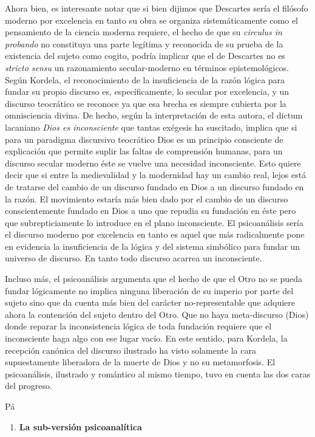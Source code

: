 Ahora bien, es interesante notar que si bien dijimos que Descartes sería el filósofo moderno por excelencia en tanto su obra se organiza sistemáticamente como el pensamiento de la ciencia moderna requiere, el hecho de que su \emph{circulus in probando} no constituya una parte legítima y reconocida de su prueba de la existencia del sujeto como cogito, podría implicar que el de Descartes no es \emph{stricto sensu} un razonamiento secular-moderno en términos epistemológicos. Según Kordela, el reconocimiento de la insuficiencia de la razón lógica para fundar su propio discurso es, específicamente, lo secular por excelencia, y un discurso teocrático se reconoce ya que esa brecha es siempre cubierta por la omnisciencia divina. De hecho, según la interpretación de esta autora, el dictum lacaniano \emph{Dios es inconsciente} que tantas exégesis ha suscitado, implica que si para un paradigma discursivo teocrático Dios es un principio consciente de explicación que permite suplir las faltas de comprensión humanas, para un discurso secular moderno éste se vuelve una necesidad inconsciente. Esto quiere decir que si entre la medievalidad y la modernidad hay un cambio real, lejos está de tratarse del cambio de un discurso fundado en Dios a un discurso fundado en la razón. El movimiento estaría más bien dado por el cambio de un discurso conscientemente fundado en Dios a uno que repudia su fundación en éste pero que subrepticiamente lo introduce en el plano inconsciente. El psicoanálisis sería el discurso moderno por excelencia en tanto es aquel que más radicalmente pone en evidencia la insuficiencia de la lógica y del sistema simbólico para fundar un universo de discurso. En tanto todo discurso acarrea un inconsciente.

Incluso más, el psicoanálisis argumenta que el hecho de que el Otro no se pueda fundar lógicamente no implica ninguna liberación de su imperio por parte del sujeto sino que da cuenta más bien del carácter no-representable que adquiere ahora la contención del sujeto dentro del Otro. Que no haya meta-discurso (Dios) donde reparar la inconsistencia lógica de toda fundación requiere que el inconsciente haga algo con ese lugar vacío. En este sentido, para Kordela, la recepción canónica del discurso ilustrado ha visto solamente la cara supuestamente liberadora de la muerte de Dios y no su metamorfosis. El psicoanálisis, ilustrado y romántico al mismo tiempo, tuvo en cuenta las dos caras del progreso.

Pá

\begin{enumerate}
\def\labelenumi{\arabic{enumi}.}
\item
  \textbf{La sub-versión psicoanalítica}
\end{enumerate}

